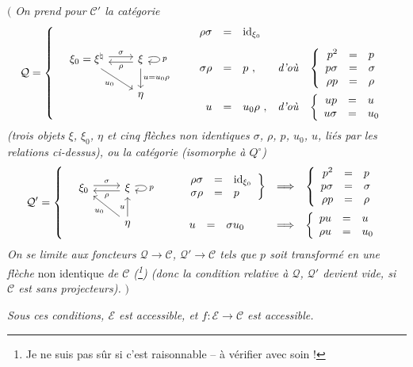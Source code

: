 \documentclass[11pt]{article}
\newcommand{\msp}[1]{\marginpar{\footnotesize [#1]}}
\begin{document}
\msp{474}

$\Big($ \textit{On prend pour $\mathcal{C}'$ la catégorie}
\[
\mathcal{Q} = \left\{ \quad
\begin{tikzcd}[column sep=2.2em]
\xi_0 = \xi^\natural \arrow[r, shift left, "\sigma"] \arrow[dr, "u_0"'] & \xi \arrow[l, shift left, "\rho"] \arrow[d, "u = u_0\rho"] \arrow[loop right, "p"] \\
 & \eta
\end{tikzcd}
\qquad
\begin{array}{rclll}
\rho\sigma & = & \mathrm{id}_{\xi_0} & & \\[2ex]
\sigma\rho & = & p\ , & \text{\textit{d'où}} & \left\{\begin{array}{rcl} p^2 & = & p \\ p\sigma & = & \sigma \\ \rho p & = & \rho \end{array}\right. \\[4ex]
u & = & u_0\rho\ , & \text{\textit{d'où}} & \left\{\begin{array}{rcl} up & = & u \\ u\sigma & = & u_0 \end{array}\right.
\end{array}
\right.
\]
\textit{(trois objets $\xi$, $\xi_0$, $\eta$ et cinq flèches non identiques $\sigma$, $\rho$, $p$, $u_0$, $u$, liés par les relations ci-dessus), ou la catégorie (isomorphe à $Q^\circ$)} %
\[
\mathcal{Q}' = \left\{ \quad
\begin{tikzcd}
\xi_0 \arrow[r, shift left, "\sigma"] & \xi \arrow[l, shift left, "\rho"] \arrow[loop right, "p"] \\
 & \eta \arrow[ul, "u_0"] \arrow[u, "u"]
\end{tikzcd}
\qquad
\begin{array}{lcl}
\left.\begin{array}{rcl} \rho\sigma & = & \mathrm{id}_{\xi_0} \\ \sigma\rho & = & p \end{array}\right\} & \Longrightarrow & \left\{\begin{array}{rcl} p^2 & = & p \\ p\sigma & = & \sigma \\ \rho p & = & \rho \end{array}\right. \\[4ex]
\begin{array}{rcl} u & = & \sigma u_0 \end{array} & \Longrightarrow & \left\{\begin{array}{rcl} pu & = & u \\ \rho u & = & u_0 \end{array}\right.
\end{array}
\right.
\]
\textit{On se limite aux foncteurs $\mathcal{Q} \longrightarrow \mathcal{C}$, $\mathcal{Q}' \longrightarrow \mathcal{C}$ tels que $p$ soit transformé en une flèche} non identique \textit{de $\mathcal{C}$ (\footnote[195]{Je ne suis pas sûr si c'est raisonnable -- à vérifier avec soin !}) (donc la condition relative à $\mathcal{Q}$, $\mathcal{Q}'$ devient vide, si $\mathcal{C}$ est sans projecteurs).} $\Big)$

\textit{Sous ces conditions, $\mathcal{E}$ est accessible, et $f : \mathcal{E} \longrightarrow \mathcal{C}$ est accessible.}
\end{document}
